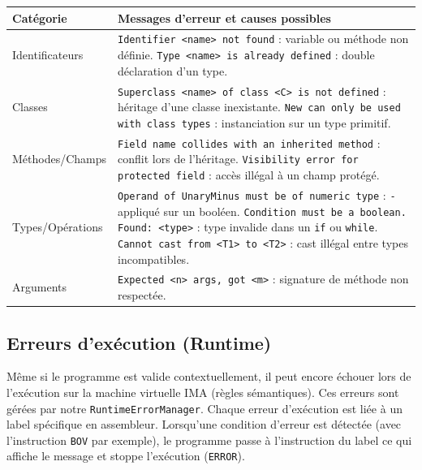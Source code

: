 \begin{table}[H]
\centering
\begin{tabularx}{\textwidth}{|l|X|}
\hline
\rowcolor{gray!10} Catégorie & Messages d'erreur et causes possibles \\
\hline
Identificateurs & \texttt{Identifier <name> not found} : variable ou méthode non définie. \newline \texttt{Type <name> is already defined} : double déclaration d'un type. \\
\hline
Classes & \texttt{Superclass <name> of class <C> is not defined} : héritage d'une classe inexistante. \newline \texttt{New can only be used with class types} : instanciation sur un type primitif. \\
\hline
Méthodes/Champs & \texttt{Field name collides with an inherited method} : conflit lors de l'héritage. \newline \texttt{Visibility error for protected field} : accès illégal à un champ protégé. \\
\hline
Types/Opérations & \texttt{Operand of UnaryMinus must be of numeric type} : \texttt{-} appliqué sur un booléen. \newline \texttt{Condition must be a boolean. Found: <type>} : type invalide dans un \texttt{if} ou \texttt{while}. \newline \texttt{Cannot cast from <T1> to <T2>} : cast illégal entre types incompatibles. \\
\hline
Arguments & \texttt{Expected <n> args, got <m>} : signature de méthode non respectée. \\
\hline
\end{tabularx}
\end{table}

\subsection{Erreurs d'exécution (Runtime)}
\noindent
Même si le programme est valide contextuellement, il peut encore échouer lors de l'exécution sur la machine virtuelle IMA (règles sémantiques). Ces erreurs sont gérées par notre \texttt{RuntimeErrorManager}. Chaque erreur d'exécution est liée à un label spécifique en assembleur. Lorsqu'une condition d'erreur est détectée (avec l'instruction \texttt{BOV} par exemple), le programme passe à l'instruction du label ce qui affiche le message et stoppe l'exécution (\texttt{ERROR}).


